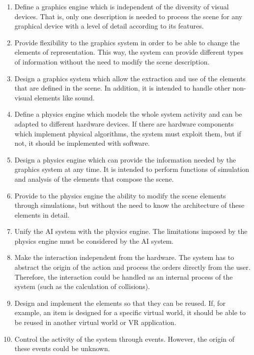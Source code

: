 \documentclass[twocolumn]{svjour3}
\begin{document}
\begin{enumerate}
    \item Define a graphics engine which is independent of the diversity of visual
devices. That is, only one description is needed to process the scene for any graphical device with
a level of detail according to its features.

    \item Provide flexibility to the graphics system in order to be
able to change the elements of representation. This way, the system can
provide different types of information without the need to modify the scene
description.

    \item Design a graphics system which allow the extraction and use of the
elements that are defined in the scene. In addition, it is intended to handle other non-visual
elements like sound.

    \item Define a physics engine which models the whole system activity
and can be adapted to different hardware devices. If there are hardware components which implement
physical algorithms, the system must exploit them, but if not, it should be implemented with
software.

    \item Design a physics engine which can provide the information needed by the graphics system at any time. It is intended to perform functions of simulation and analysis of the elements that compose the scene.

    \item Provide to the physics engine the ability to modify the scene
elements through simulations, but without the need to know the architecture of these elements in
detail.

    \item Unify the AI system with the physics engine. The limitations
imposed by the physics engine must be considered by the AI system.

    \item Make the interaction independent from the hardware. The system has to abstract the origin of the action and process the orders directly from the user. Therefore, the interaction could be handled as an internal process of the system (such as the calculation of collisions).

    \item Design and implement the elements so that they can be reused. If, for
example, an item is designed for a specific virtual world, it should be able to
be reused in another virtual world or VR application.

    \item Control the activity of the system through events. However, the origin of these events could be unknown.

\end{enumerate}
\end{document}
